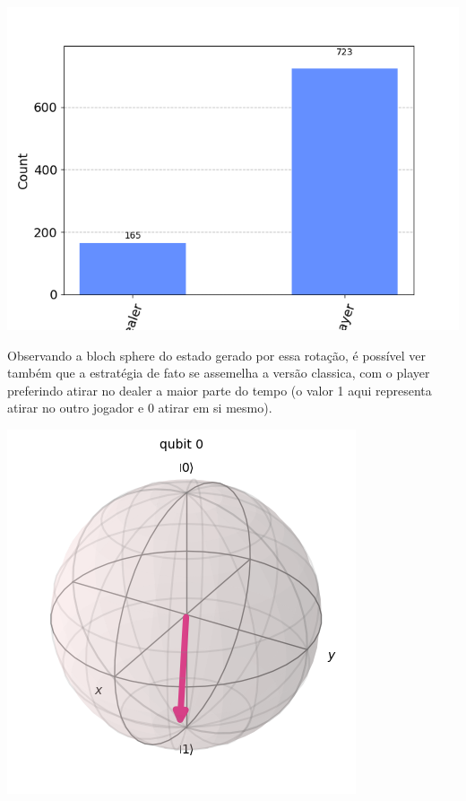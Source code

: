 \documentclass{article}
\begin{document}
\begin{center}
	\includegraphics[scale=0.6]{final_buckshot_roulette_quantum_optimal_strategy.png}
	\label{fig:bckr-circuit-result}
\end{center}

Observando a bloch sphere do estado gerado por essa rotação, é possível ver também que a estratégia de fato se assemelha a versão classica, com o player preferindo atirar no dealer a maior parte do tempo (o valor 1 aqui representa atirar no outro jogador e 0 atirar em si mesmo).

\begin{center}
	\includegraphics[scale=0.6]{player_optimal_strategy_bloch.png}
	\label{fig:bckr-bloch-sphere-best-strategy}
\end{center}
\end{document}
